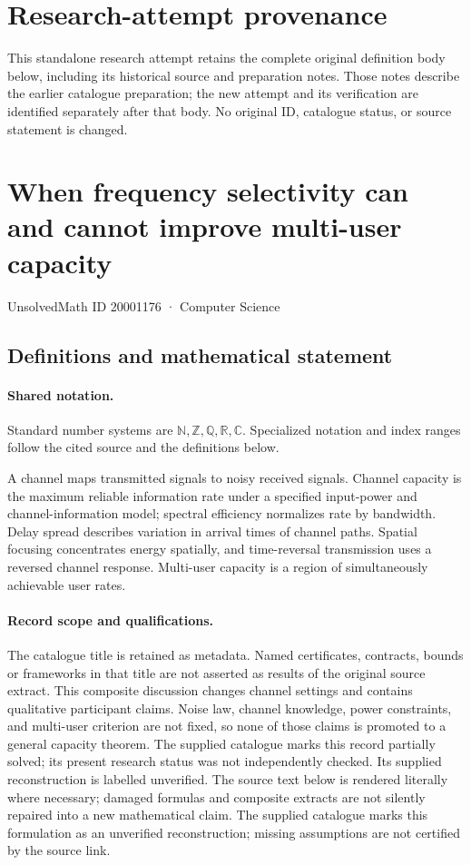 \documentclass[11pt]{article}
\begin{document}
\section*{Research-attempt provenance}
This standalone research attempt retains the complete original definition body below,
including its historical source and preparation notes. Those notes describe the
earlier catalogue preparation; the new attempt and its verification are identified
separately after that body. No original ID, catalogue status, or source statement is changed.

\section{When frequency selectivity can and cannot improve multi-user capacity}\label{20001176}
{\small UnsolvedMath ID 20001176 · Computer Science}
\subsection{Definitions and mathematical statement}

\paragraph{Shared notation.}Standard number systems are $\mathbb N,\mathbb Z,\mathbb Q,\mathbb R,\mathbb C$. Specialized notation and index ranges follow the cited source and the definitions below.


A channel maps transmitted signals to noisy received signals. Channel capacity is the maximum reliable information rate under a specified input-power and channel-information model; spectral efficiency normalizes rate by bandwidth. Delay spread describes variation in arrival times of channel paths. Spatial focusing concentrates energy spatially, and time-reversal transmission uses a reversed channel response. Multi-user capacity is a region of simultaneously achievable user rates.
\paragraph{Record scope and qualifications.}
The catalogue title is retained as metadata. Named certificates, contracts, bounds or frameworks in that title are not asserted as results of the original source extract.
This composite discussion changes channel settings and contains qualitative participant claims. Noise law, channel knowledge, power constraints, and multi-user criterion are not fixed, so none of those claims is promoted to a general capacity theorem. The supplied catalogue marks this record partially solved; its present research status was not independently checked. Its supplied reconstruction is labelled unverified.
The source text below is rendered literally where necessary; damaged formulas and composite extracts are not silently repaired into a new mathematical claim.
The supplied catalogue marks this formulation as an unverified reconstruction; missing assumptions are not certified by the source link.
\end{document}
